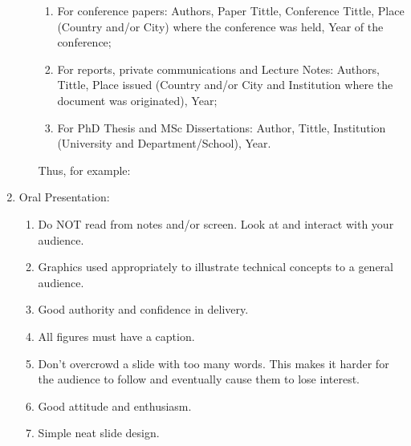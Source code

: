 \documentclass[14pt,twoside]{report}
\begin{document}
\begin{enumerate}
\begin{enumerate}
\begin{enumerate}
\item For conference papers: Authors, Paper Tittle, Conference Tittle, Place (Country and/or City) where the conference was held, Year of the conference;
\item For reports,  private communications and Lecture Notes: Authors, Tittle, Place issued (Country and/or City and Institution where the document was originated), Year;
\item For PhD Thesis and MSc Dissertations: Author, Tittle, Institution (University and Department/School), Year.
\end{enumerate}  
Thus, for example:
%
\end{enumerate}

\item Oral Presentation:
\begin{enumerate}
%
\item Do NOT read from notes and/or screen. Look at and interact with your audience.
%
\item Graphics used appropriately to illustrate technical concepts to a general audience. 
%
\item Good authority and confidence in delivery. 
%
\item All figures must have a caption.
%
\item Don’t overcrowd a slide with too many words. This makes it harder for the audience to follow and eventually cause them to lose interest.
%
\item Good attitude and enthusiasm.
%
\item Simple neat slide design.
%
\end{enumerate}

\end{enumerate}
\end{document}
